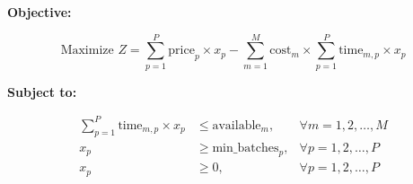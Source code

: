 \documentclass{article}
\begin{document}
\textbf{Objective:}

\[
\text{Maximize } Z = \sum_{p=1}^{P} \text{price}_{p} \times x_p - \sum_{m=1}^{M} \text{cost}_{m} \times \sum_{p=1}^{P} \text{time}_{m,p} \times x_p
\]

\textbf{Subject to:}

\[
\begin{align*}
\sum_{p=1}^{P} \text{time}_{m,p} \times x_p & \leq \text{available}_{m}, & \forall m = 1, 2, \ldots, M \\
x_p & \geq \text{min\_batches}_{p}, & \forall p = 1, 2, \ldots, P \\
x_p & \geq 0, & \forall p = 1, 2, \ldots, P
\end{align*}
\]
\end{document}
